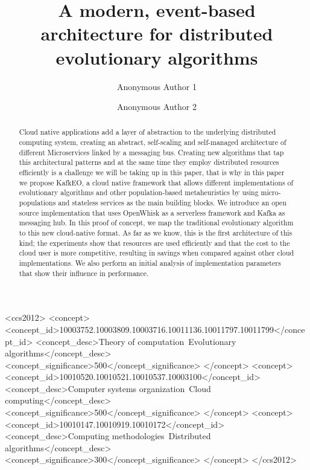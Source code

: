 \documentclass[sigconf]{acmart}
\begin{document}
\title{A modern, event-based architecture for distributed evolutionary algorithms}

\author{Anonymous Author 1}

\author{Anonymous Author 2}

\renewcommand{\shortauthors}{A. Author et al.}


\begin{abstract}
  Cloud native applications add a layer of abstraction to the
underlying distributed computing system, creating an abstract,
self-scaling and self-managed architecture of different Microservices
linked by a messaging bus. Creating new algorithms that tap this
architectural patterns and at the same time they employ distributed
resources efficiently is a challenge we will be taking up in this
paper, that is why in this paper we propose KafkEO, a cloud native
framework that allows different implementations of evolutionary
algorithms and other population-based metaheuristics by using
micro-populations and stateless services as the main building
blocks. We introduce an open source implementation that uses OpenWhisk
as a serverless framework and Kafka as messaging hub. In this proof of
concept, we map the traditional evolutionary algorithm to this new
cloud-native format.  As far as we know, this is the first
architecture of this kind; the experiments show that resources are
used efficiently and that the cost to the cloud user is more
competitive, resulting in savings when compared against other cloud
implementations. We also perform an initial analysis of implementation
parameters that show their influence in performance.
\end{abstract}

\begin{CCSXML}
<ccs2012>
<concept>
<concept_id>10003752.10003809.10003716.10011136.10011797.10011799</concept_id>
<concept_desc>Theory of computation~Evolutionary algorithms</concept_desc>
<concept_significance>500</concept_significance>
</concept>
<concept>
<concept_id>10010520.10010521.10010537.10003100</concept_id>
<concept_desc>Computer systems organization~Cloud computing</concept_desc>
<concept_significance>500</concept_significance>
</concept>
<concept>
<concept_id>10010147.10010919.10010172</concept_id>
<concept_desc>Computing methodologies~Distributed algorithms</concept_desc>
<concept_significance>300</concept_significance>
</concept>
</ccs2012>
\end{CCSXML}
\end{document}
